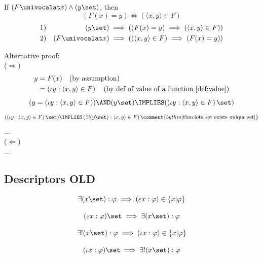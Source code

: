 \begin{theorem}
\label{thm:pair in function}
If $(F\univocalat x)\land(y\set)$, then
\[
\left(F(x)=y\right)\iff\left(\langle x,y\rangle\in F\right)
\]
\begin{align*}
1) & & (y\set)
\implies
\left(
\left(F(x)=y\right)
\implies
\left(\langle x,y\rangle\in F\right)
\right)
\\
2) & & (F\univocalat x)
\implies
\left(
\left(\langle x,y\rangle\in F\right)
\implies
\left(F(x)=y\right)
\right)
\\
\end{align*}
\end{theorem}
Alternative proof:\\
\Proof
\noindent($\Rightarrow$)
\begin{align*}
y&=F(x)
\quad(\mbox{by assumption}) \\
&=\left(\iota y: \langle x,y\rangle\in F\right)
\quad(\mbox{by def of value of a function \ref{def:value}})
\\
\end{align*}
\[
(y=\left(\iota y: \langle x,y\rangle\in F\right))
\AND
(y\set)
\IMPLIES
(\left(\iota y: \langle x,y\rangle\in F\right) \set)
\]
\[
(\left(\iota y: \langle x,y\rangle\in F\right) \set)
\IMPLIES
\left(\exists!(y\set):\langle x,y\rangle\in F\right)
\comment{by thm \ref{thm:iota set exists unique set}}
\]
...\\
\noindent($\Leftarrow$)\\
...\\
\Done
\subsection{Descriptors OLD}
\begin{axiom}
\[
\exists (x\set):\varphi
\implies
(\varepsilon x: \varphi) \in \{x|\varphi\}
\]
\end{axiom}
\begin{axiom}

\[
(\varepsilon x: \varphi) \set
\implies
\exists (x\set):\varphi
\]
\end{axiom}

\begin{axiom}
\[
\exists! (x\set):\varphi
\implies
(\iota x: \varphi) \in \{x|\varphi\}
\]
\end{axiom}
\begin{axiom}
\[
(\iota x: \varphi) \set
\implies
\exists! (x\set):\varphi
\]
\end{axiom}



